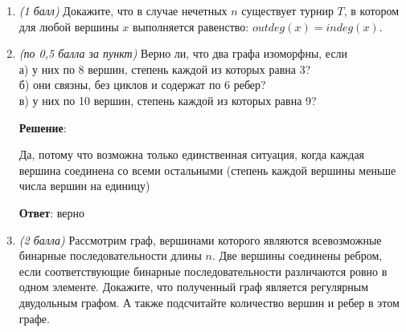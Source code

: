 \documentclass{article}
\begin{document}
\begin{enumerate}
    \item \textit{(1 балл)} Докажите, что в случае нечетных $n$ существует турнир $T$, в котором для любой вершины $x$ выполняется равенство: $outdeg(x) = indeg(x)$.
    
    \item \textit{(по 0,5 балла за пункт)} Верно ли, что два графа изоморфны, если\\
    а) у них по 8 вершин, степень каждой из которых равна 3?\\
    б) они связны, без циклов и содержат по 6 ребер?\\
    в) у них по 10 вершин, степень каждой из которых равна 9?

    \textbf{Решение}:

    Да, потому что возможна только единственная ситуация, когда каждая вершина соединена со всеми остальными (степень каждой вершины меньше числа вершин на единицу)

    \textbf{Ответ}:
    верно
    
    \item \textit{(2 балла)} Рассмотрим граф, вершинами которого являются всевозможные бинарные последовательности длины $n$. Две вершины соединены ребром, если соответствующие бинарные последовательности различаются ровно в одном элементе. Докажите, что полученный граф является регулярным двудольным графом. А также подсчитайте количество вершин и ребер в этом графе.
    
\end{enumerate}
\end{document}
